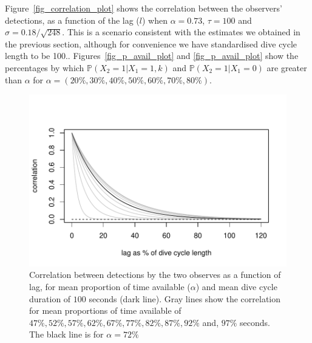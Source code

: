 \documentclass[useAMS, usenatbib, referee]{biom}\usepackage[]{graphicx}\usepackage[]{color}
\makeatletter
\def\maxwidth{ %
  \ifdim\Gin@nat@width>\linewidth
    \linewidth
  \else
    \Gin@nat@width
  \fi
}
\newenvironment{knitrout}{}{} %
\makeatother
\begin{document}
Figure~\ref{fig_correlation_plot} shows the correlation between the observers' detections, as a function of the lag ($l$) when $\alpha=0.73$, $\tau=100$ and $\sigma=0.18/\sqrt{248}$. This is a scenario consistent with the estimates we obtained in the previous section, although for convenience we have standardised dive cycle length to be 100.. Figures~\ref{fig_p_avail_plot} and \ref{fig_p_avail_plot} show the percentages by which $\mathbb{P}(X_2=1|X_1=1,k)$ and $\mathbb{P}(X_2=1|X_1=0)$ are greater than $\alpha$ for $\alpha=(20\%,30\%,40\%,50\%,60\%,70\%,80\%)$.


\begin{knitrout}
\color{fgcolor}\begin{figure}

{\centering \includegraphics[width=\maxwidth]{figs/fig_correlation_plot-1} 

}

\caption[Correlation between detections by the two observes as a function of lag, for mean proportion of time available (\(\alpha\)) and mean dive cycle duration of \(100\) seconds (dark line)]{Correlation between detections by the two observes as a function of lag, for mean proportion of time available (\(\alpha\)) and mean dive cycle duration of \(100\) seconds (dark line). Gray lines show the correlation for mean proportions of time available of \(47\%, 52\%, 57\%, 62\%, 67\%, 77\%, 82\%, 87\%, 92\%\) and, \(97\%\) seconds. The black line is for \(\alpha=72\%\)}\label{fig:fig_correlation_plot}
\end{figure}


\end{knitrout}
\end{document}
